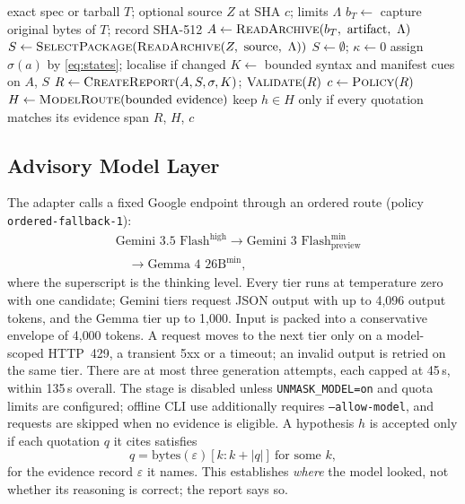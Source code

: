 \documentclass[conference]{IEEEtran}
\newcommand{\code}[1]{\texttt{#1}}
\begin{document}
\begin{algorithm}[t]
\caption{One UNMASK check}
\label{alg:check}
\begin{algorithmic}[1]
\Require exact spec or tarball $T$; optional source $Z$ at SHA $c$; limits $\Lambda$
\State $b_T \gets$ capture original bytes of $T$; record SHA-512
\State $A \gets \textsc{ReadArchive}(b_T,\ \text{artifact},\ \Lambda)$
 \State $S \gets \textsc{SelectPackage}(\textsc{ReadArchive}(Z,\ \text{source},\ \Lambda))$
\Else \State $S \gets \emptyset$; $\kappa \gets 0$ \EndIf
{} \State assign $\sigma(a)$ by \eqref{eq:states}; localise if \textsf{changed} \EndFor
\State $K \gets$ bounded syntax and manifest cues on $A$, $S$
\State $R \gets \textsc{CreateReport}(A, S, \sigma, K)$; $\textsc{Validate}(R)$
\State $c \gets \textsc{Policy}(R)$ 
  \State $H \gets \textsc{ModelRoute}(\text{bounded evidence})$
  \State keep $h\in H$ only if every quotation matches its evidence span
\EndIf
\State \Return $R$, $H$, $c$
\end{algorithmic}
\end{algorithm}

\subsection{Advisory Model Layer}
The adapter calls a fixed Google endpoint through an ordered route
(policy \code{ordered-fallback-1}):
\begin{equation}
\begin{aligned}
&\text{Gemini 3.5 Flash}^{\text{high}} \rightarrow
\text{Gemini 3 Flash}^{\text{min}}_{\text{preview}}\\
&\quad\rightarrow \text{Gemma 4 26B}^{\text{min}},
\end{aligned}
\end{equation}
where the superscript is the thinking level. Every tier runs at temperature
zero with one candidate; Gemini tiers request JSON output with up to 4{,}096
output tokens, and the Gemma tier up to 1{,}000. Input is packed into a
conservative envelope of 4{,}000 tokens. A request moves to the next tier only
on a model-scoped HTTP~429, a transient 5xx or a timeout; an invalid output is
retried on the same tier. There are at most three generation attempts, each
capped at 45\,s, within 135\,s overall. The stage is disabled unless
\code{UNMASK\_MODEL=on} and quota limits are configured; offline CLI use
additionally requires \code{--allow-model}, and requests are skipped when no
evidence is eligible. A hypothesis $h$ is accepted
only if each quotation $q$ it cites satisfies
\begin{equation}
q = \text{bytes}(\varepsilon)[k : k+|q|] \ \text{for some } k,
\end{equation}
for the evidence record $\varepsilon$ it names. This establishes \emph{where}
the model looked, not whether its reasoning is correct; the report says so.
\end{document}
